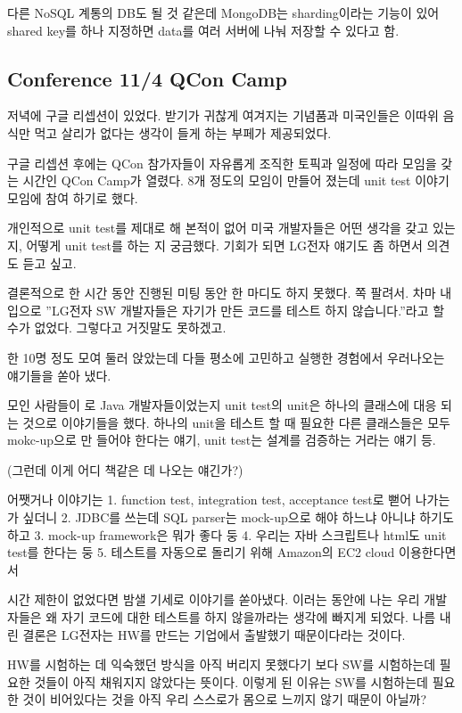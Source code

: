 \documentclass[a4paper]{article}
\begin{document}
다른 NoSQL 계통의 DB도 될 것 같은데 MongoDB는 sharding이라는 기능이
있어 shared key를 하나 지정하면 data를 여러 서버에 나눠 저장할 수
있다고 함.
 
\subsection{Conference 11/4 QCon Camp}
 
저녁에 구글 리셉션이 있었다. 받기가 귀찮게 여겨지는 기념품과 미국인들은
이따위 음식만 먹고 살리가 없다는 생각이 들게 하는 부페가 제공되었다.
 
구글 리셉션 후에는 QCon 참가자들이 자유롭게 조직한 토픽과 일정에 따라
모임을 갖는 시간인 QCon Camp가 열렸다. 8개 정도의 모임이 만들어 졌는데
unit test 이야기 모임에 참여 하기로 했다.
 
개인적으로 unit test를 제대로 해 본적이 없어 미국 개발자들은 어떤
생각을 갖고 있는지, 어떻게 unit test를 하는 지 궁금했다. 기회가 되면
LG전자 얘기도 좀 하면서 의견도 듣고 싶고.
 
결론적으로 한 시간 동안 진행된 미팅 동안 한 마디도 하지 못했다. 쪽
팔려서. 차마 내 입으로 ”LG전자 SW 개발자들은 자기가 만든 코드를 테스트
하지 않습니다.”라고 할 수가 없었다. 그렇다고 거짓말도 못하겠고.
 
한 10명 정도 모여 둘러 앉았는데 다들 평소에 고민하고 실행한 경험에서
우러나오는 얘기들을 쏟아 냈다.
 
모인 사람들이 로 Java 개발자들이었는지 unit test의 unit은 하나의
클래스에 대응 되는 것으로 이야기들을 했다. 하나의 unit을 테스트 할 때
필요한 다른 클래스들은 모두 mokc-up으로 만 들어야 한다는 얘기, unit
test는 설계를 검증하는 거라는 얘기 등.
 
(그런데 이게 어디 책같은 데 나오는 얘긴가?)
 
어쨋거나 이야기는 
1. function test, integration test, acceptance test로 뻗어 나가는 가 싶더니 
2. JDBC를 쓰는데 SQL parser는  mock-up으로 해야 하느냐 아니냐 하기도 하고 
3. mock-up framework은 뭐가 좋다 둥 
4. 우리는 자바 스크립트나 html도 unit test를 한다는 둥
5. 테스트를 자동으로 돌리기 위해 Amazon의 EC2 cloud 이용한다면서 
 
시간 제한이 없었다면 밤샐 기세로 이야기를 쏟아냈다. 이러는 동안에 나는
우리 개발자들은 왜 자기 코드에 대한 테스트를 하지 않을까라는 생각에
빠지게 되었다. 나름 내린 결론은 LG전자는 HW를 만드는 기업에서 출발했기
때문이다라는 것이다.
 
HW를 시험하는 데 익숙했던 방식을 아직 버리지 못했다기 보다 SW를
시험하는데 필요한 것들이 아직 채워지지 않았다는 뜻이다. 이렇게 된
이유는 SW를 시험하는데 필요한 것이 비어있다는 것을 아직 우리 스스로가
몸으로 느끼지 않기 때문이 아닐까?
 
\end{document}
